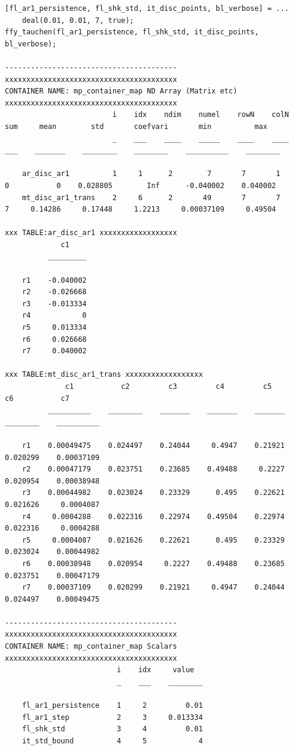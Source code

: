 \documentclass[
]{book}
\begin{document}
\begin{verbatim}
[fl_ar1_persistence, fl_shk_std, it_disc_points, bl_verbose] = ...
    deal(0.01, 0.01, 7, true);
ffy_tauchen(fl_ar1_persistence, fl_shk_std, it_disc_points, bl_verbose);

----------------------------------------
xxxxxxxxxxxxxxxxxxxxxxxxxxxxxxxxxxxxxxxx
CONTAINER NAME: mp_container_map ND Array (Matrix etc)
xxxxxxxxxxxxxxxxxxxxxxxxxxxxxxxxxxxxxxxx
                         i    idx    ndim    numel    rowN    colN    sum     mean        std       coefvari       min          max   
                         _    ___    ____    _____    ____    ____    ___    _______    ________    ________    __________    ________

    ar_disc_ar1          1     1      2        7       7       1       0           0    0.028805        Inf      -0.040002    0.040002
    mt_disc_ar1_trans    2     6      2       49       7       7       7     0.14286     0.17448     1.2213     0.00037109     0.49504

xxx TABLE:ar_disc_ar1 xxxxxxxxxxxxxxxxxx
             c1    
          _________

    r1    -0.040002
    r2    -0.026668
    r3    -0.013334
    r4            0
    r5     0.013334
    r6     0.026668
    r7     0.040002

xxx TABLE:mt_disc_ar1_trans xxxxxxxxxxxxxxxxxx
              c1           c2         c3         c4         c5          c6           c7    
          __________    ________    _______    _______    _______    ________    __________

    r1    0.00049475    0.024497    0.24044     0.4947    0.21921    0.020299    0.00037109
    r2    0.00047179    0.023751    0.23685    0.49488     0.2227    0.020954    0.00038948
    r3    0.00044982    0.023024    0.23329      0.495    0.22621    0.021626     0.0004087
    r4     0.0004288    0.022316    0.22974    0.49504    0.22974    0.022316     0.0004288
    r5     0.0004087    0.021626    0.22621      0.495    0.23329    0.023024    0.00044982
    r6    0.00038948    0.020954     0.2227    0.49488    0.23685    0.023751    0.00047179
    r7    0.00037109    0.020299    0.21921     0.4947    0.24044    0.024497    0.00049475

----------------------------------------
xxxxxxxxxxxxxxxxxxxxxxxxxxxxxxxxxxxxxxxx
CONTAINER NAME: mp_container_map Scalars
xxxxxxxxxxxxxxxxxxxxxxxxxxxxxxxxxxxxxxxx
                          i    idx     value  
                          _    ___    ________

    fl_ar1_persistence    1     2         0.01
    fl_ar1_step           2     3     0.013334
    fl_shk_std            3     4         0.01
    it_std_bound          4     5            4
\end{verbatim}
\end{document}
